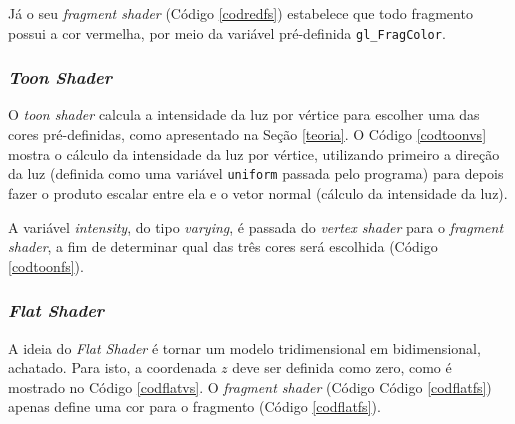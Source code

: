 	

	Já o seu \textit{fragment shader} (Código \ref{codredfs}) estabelece que todo fragmento possui a cor vermelha, por meio da variável pré-definida \texttt{gl\_FragColor}.
	
	

\subsubsection{\textit{Toon Shader}}

	O  \textit{toon shader} calcula a intensidade da luz por vértice para escolher uma das cores pré-definidas, como apresentado na Seção \ref{teoria}. O Código  \ref{codtoonvs} mostra o cálculo da intensidade da luz por vértice, utilizando primeiro a direção da luz (definida como uma variável \texttt{uniform} passada pelo programa) para depois fazer o produto escalar entre ela e o vetor normal (cálculo da intensidade da luz).  

	

	A variável \textit{intensity}, do tipo \textit{varying}, é passada do \textit{vertex shader} para o \textit{fragment shader}, a fim de determinar qual das três cores será escolhida (Código \ref{codtoonfs}). 
  
 	

\subsubsection{\textit{Flat Shader}}

	A ideia do \textit{Flat Shader} é tornar um modelo tridimensional em bidimensional, achatado. Para isto, a coordenada $z$ deve ser definida como zero, como é mostrado no Código \ref{codflatvs}. O \textit{fragment shader} (Código  Código \ref{codflatfs}) apenas define uma cor para o fragmento (Código \ref{codflatfs}).

	

